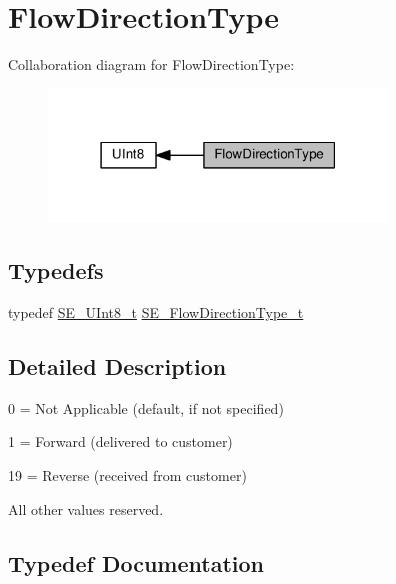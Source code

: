 \hypertarget{group__FlowDirectionType}{}\section{Flow\+Direction\+Type}
\label{group__FlowDirectionType}
Collaboration diagram for Flow\+Direction\+Type\+:\nopagebreak
\begin{figure}[H]
\begin{center}
\leavevmode
\includegraphics[width=255pt]{group__FlowDirectionType}
\end{center}
\end{figure}
\subsection*{Typedefs}
\begin{DoxyCompactItemize}
\item 
typedef \hyperlink{group__UInt8_gaf7c365a1acfe204e3a67c16ed44572f5}{S\+E\+\_\+\+U\+Int8\+\_\+t} \hyperlink{group__FlowDirectionType_ga83b9e4bedc8eaad2a4210b0dab7be48e}{S\+E\+\_\+\+Flow\+Direction\+Type\+\_\+t}
\end{DoxyCompactItemize}


\subsection{Detailed Description}
0 = Not Applicable (default, if not specified)

1 = Forward (delivered to customer)

19 = Reverse (received from customer)

All other values reserved. 

\subsection{Typedef Documentation}
\mbox{\label{group__FlowDirectionType_ga83b9e4bedc8eaad2a4210b0dab7be48e}} 

